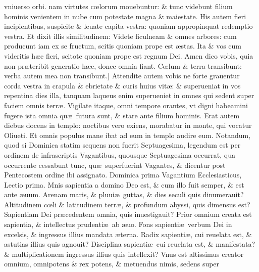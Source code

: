 \documentclass[a5paper,10pt]{book}
\def\leftmarginnote{%
	\lrmarginnote{\hskip -\marginparsep \hskip -6.5em}}
\def\rightmarginnote{%
	\lrmarginnote{\hskip\columnwidth \hskip -1em}}
\def\ae{æ}
\def\oe{œ}
\begin{document}
\begin{multicols*}{2}
vniuerso orbi. nam virtutes c\oe lorum mouebuntur: \& tunc videbunt filium hominis venientem in nube cum potestate magna \& maiestate.
His autem fieri incipientibus, suspicite \& leuate capita vestra: quoniam appropinquat redemptio vestra.
Et\rightmarginnote{F} dixit illis similitudinem: Videte ficulneam \& omnes arbores: cum producunt iam ex se fructum, scitis quoniam prope est \ae stas.
Ita \& vos cum videritis h\ae c fieri, scitote quoniam prope est regnum Dei. Amen dico vobis, quia non pr\ae teribit generatio h\ae c, donec omnia fiant.
C\oe lum \& terra transibunt: verba autem mea non\rightmarginnote{G} transibunt.]
Attendite autem vobis ne forte grauentur corda vestra in crapula \& ebrietate \& curis huius vit\ae : \& superueniat in vos repentina dies illa, tanquam laqueus enim superueniet in omnes qui sedent super faciem omnis terr\ae .
Vigilate itaque, omni tempore orantes, vt digni habeamini fugere ista omnia qu\ae \ futura sunt, \& stare ante filium hominis.
Erat autem diebus docens in templo: noctibus vero exiens, morabatur in monte, qui vocatur Oliueti. Et omnis populus mane ibat ad eum in templo audire eum.
\newline {} \color{red} Notandum, quod si Dominica statim sequens non fuerit Septuagesima, legendum est per ordinem de infrascriptis Vagantibus, quousque Septuagesima occurrat, qua occurrente cessabunt tunc, qu\ae \ superfuerint Vagantes, \& dicentur post Pentecostem ordine ibi assignato. \color{black}
\newline {} \color{red} \hypertarget{SUN-PRIMA-VAGAN}{Dominica prima} Vagantium Ecclesiasticus, \quad Lectio prima. \color{black}
\vspace{-1.25em}
Mnis\leftmarginnote{\begin{flushright}ca. 1.\end{flushright}} sapientia a domino Deo est, \& cum illo fuit semper, \& est ante \ae uum.
Arenam maris, \& pluui\ae \ guttas, \& dies seculi quis dinumerauit? Altitudinem c\oe li \& latitudinem terr\ae , \& profundum abyssi, quis dimensus est?
Sapientiam Dei pr\ae cedentem omnia, quis inuestigauit? Prior omnium creata est sapientia, \& intellectus prudenti\ae \ ab \ae uo. Fons sapienti\ae \ verbum Dei in excelsis, \& ingressus illius mandata \ae terna.
Radix sapienti\ae , cui reuelata est, \& astutias illius quis agnouit? Disciplina sapienti\ae \ cui reuelata est, \& manifestata? \& multiplicationem ingressus illius quis intellexit?
Vnus est altissimus creator omnium, omnipotens \& rex potens, \& metuendus nimis, sedens super

\end{multicols*}
\end{document}
